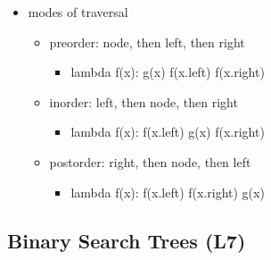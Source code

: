\documentclass[
]{article}
\providecommand{\tightlist}{%
  \setlength{\itemsep}{0pt}\setlength{\parskip}{0pt}}
\begin{document}
\begin{itemize}
\tightlist
\item
  modes of traversal

  \begin{itemize}
  \tightlist
  \item
    preorder: node, then left, then right

    \begin{itemize}
    \tightlist
    \item
      lambda f(x): g(x) f(x.left) f(x.right)
    \end{itemize}
  \item
    inorder: left, then node, then right

    \begin{itemize}
    \tightlist
    \item
      lambda f(x): f(x.left) g(x) f(x.right)
    \end{itemize}
  \item
    postorder: right, then node, then left

    \begin{itemize}
    \tightlist
    \item
      lambda f(x): f(x.left) f(x.right) g(x)
    \end{itemize}
  \end{itemize}
\end{itemize}

\hypertarget{binary-search-trees-l7}{%
\subsection{Binary Search Trees (L7)}\label{binary-search-trees-l7}}
\end{document}
